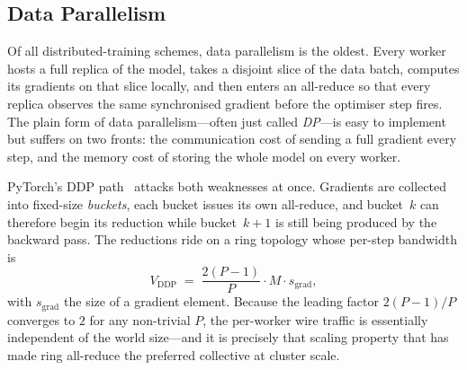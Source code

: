 \subsection{Data Parallelism}\label{sec:dp_bg}
Of all distributed-training schemes, data parallelism is the
oldest. Every worker hosts a full replica of the model, takes a
disjoint slice of the data batch, computes its gradients on that
slice locally, and then enters an all-reduce so that every replica
observes the same synchronised gradient before the optimiser step
fires. The plain form of data parallelism---often just called
\emph{DP}---is easy to implement but suffers on two fronts: the
communication cost of sending a full gradient every step, and the
memory cost of storing the whole model on every worker.

PyTorch's DDP path~\cite{li2020pytorch} attacks both weaknesses at
once. Gradients are collected into fixed-size \emph{buckets}, each
bucket issues its own all-reduce, and bucket~$k$ can therefore
begin its reduction while bucket~$k+1$ is still being produced by
the backward pass. The reductions ride on a ring topology whose
per-step bandwidth is
\begin{equation}
    V_{\text{DDP}} \;=\; \frac{2(P-1)}{P} \cdot M \cdot s_{\text{grad}} ,
\end{equation}
with $s_{\text{grad}}$ the size of a gradient element. Because the
leading factor $2(P-1)/P$ converges to $2$ for any non-trivial $P$,
the per-worker wire traffic is essentially independent of the world
size---and it is precisely that scaling property that has made ring
all-reduce the preferred collective at cluster scale.

